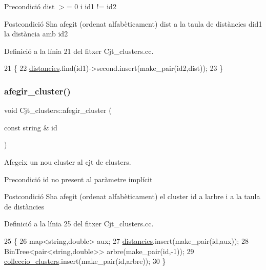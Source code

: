 \begin{DoxyPrecond}{Precondició}
dist $>$= 0 i id1 != id2 
\end{DoxyPrecond}
\begin{DoxyPostcond}{Postcondició}
S\textquotesingle{}ha afegit (ordenat alfabèticament) dist a la taula de distàncies d\textquotesingle{}id1 la distància amb id2 
\end{DoxyPostcond}


Definició a la línia 21 del fitxer Cjt\+\_\+clusters.\+cc.


\begin{DoxyCode}
21                                                                                               \{
22     \hyperlink{class_cjt__clusters_a8e94e53830e3224d791dcf7dbd0a6082}{distancies}.find(id1)->second.insert(make\_pair(id2,dist));
23 \}
\end{DoxyCode}
\mbox{\label{class_cjt__clusters_a2a27f4c57c217eeec5e91777dda19c9d}} 
\subsubsection{\texorpdfstring{afegir\+\_\+cluster()}{afegir\_cluster()}}
{\footnotesize\ttfamily void Cjt\+\_\+clusters\+::afegir\+\_\+cluster (\begin{DoxyParamCaption}\item[{const string \&}]{id }\end{DoxyParamCaption})}



Afegeix un nou cluster al cjt de clusters. 

\begin{DoxyPrecond}{Precondició}
id no present al paràmetre implícit 
\end{DoxyPrecond}
\begin{DoxyPostcond}{Postcondició}
S\textquotesingle{}ha afegit (ordenat alfabèticament) el cluster id a l\textquotesingle{}arbre i a la taula de distàncies 
\end{DoxyPostcond}


Definició a la línia 25 del fitxer Cjt\+\_\+clusters.\+cc.


\begin{DoxyCode}
25                                                  \{
26     map<string,double> aux;
27     \hyperlink{class_cjt__clusters_a8e94e53830e3224d791dcf7dbd0a6082}{distancies}.insert(make\_pair(\textcolor{keywordtype}{id},aux));
28     BinTree<pair<string,double>> arbre(make\_pair(\textcolor{keywordtype}{id},-1));
29     \hyperlink{class_cjt__clusters_aea7d6362517dd16cbd12736a3da50021}{colleccio\_clusters}.insert(make\_pair(\textcolor{keywordtype}{id},arbre));
30 \}
\end{DoxyCode}
\mbox{\label{class_cjt__clusters_a70aca86e77c34ce652d857b16cc2572f}} 
